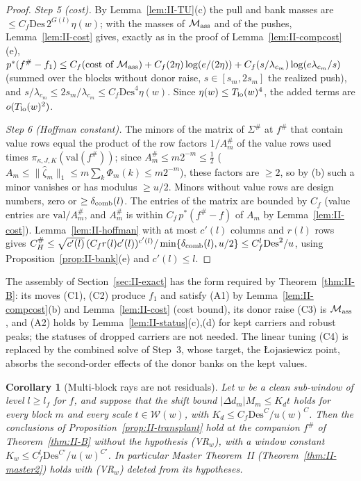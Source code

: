 \documentclass[10pt]{amsart}
\newtheorem{corollary}[theorem]{Corollary}
\theoremstyle{definition}
\theoremstyle{remark}
\begin{document}
\begin{proof}
\emph{Step 5 (cost).}  By Lemma~\ref{lem:II-TU}(c) the pull and bank
masses are $\le C_f\mathrm{Des}\,2^{G(l)}\eta(w)$; with the masses of
$\mathcal M_{\rm ass}$ and of the pushes, Lemma~\ref{lem:II-cost} gives,
exactly as in the proof of Lemma~\ref{lem:II-compcost}(e),
$p^*(f^\#-f_1)\le C_f(\text{cost of }\mathcal M_{\rm ass})+C_f(2\eta)\log(e/
(2\eta))+C_f(s/\lambda_{c_m})\log(e\lambda_{c_m}/s)$ (summed over the
blocks without donor raise, $s\in[s_m,2s_m]$ the realized push), and
$s/\lambda_{c_m}\le2s_m/\lambda_{c_m}\le C_f\mathrm{Des}^4\eta(w)$.  Since $\eta(w)\le T_{\rm lo}(w)^4$,
the added terms are $o(T_{\rm lo}(w)^2)$.

\emph{Step 6 (Hoffman constant).}  The minors of the matrix of $\Sigma^\#$
at $f^\#$ that contain value rows equal the product of the row factors
$1/A^\#_m$ of the value rows used times $\pi_{\kappa,J,K}(\mathrm{val}(f^\#))$;
since $A^\#_m\le m2^{-m}\le\frac12$ \textup{(}$A_m\le\|\hat\zeta_m\|_1\le
m\sum_k\Phi_m(k)\le m2^{-m}$\textup{)}, these factors are $\ge2$, so by (b)
such a minor vanishes or has modulus $\ge u/2$.  Minors without value rows
are design numbers, zero or $\ge\delta_{\rm comb}(l)$.  The entries of the
matrix are bounded by $C_f$ (value entries are $\mathrm{val}/A^\#_m$, and
$A^\#_m$ is within $C_f\,p^*(f^\#-f)$ of $A_m$ by Lemma~\ref{lem:II-cost}).
Lemma~\ref{lem:II-hoffman} with at most $c'(l)$ columns and $r(l)$ rows gives
$C^\#_H\le\sqrt{c'(l)}\,(C_fr(l)c'(l))^{c'(l)}/\min\{\delta_{\rm comb}(l),u/2\}
\le C_f^l\mathrm{Des}^2/u$, using Proposition~\ref{prop:II-bank}(e) and
$c'(l)\le l$.
\end{proof}

The assembly of Section~\ref{sec:II-exact} has the form required by
Theorem~\ref{thm:II-B}: its moves (C1), (C2) produce $f_1$ and satisfy (A1)
by Lemma~\ref{lem:II-compcost}(b) and Lemma~\ref{lem:II-cost} (cost bound),
its donor raise (C3) is $\mathcal M_{\rm ass}$, and (A2) holds by
Lemma~\ref{lem:II-status}(c),(d) for kept carriers and robust peaks; the
statuses of dropped carriers are not needed.  The linear tuning (C4) is replaced by the
combined solve of Step~3, whose target, the {\L}ojasiewicz point, absorbs
the second-order effects of the donor banks on the kept values.

\begin{corollary}[Multi-block rays are not residuals]\label{cor:II-B1}
Let $w$ be a clean sub-window of level $l\ge l_f$ for $f$, and suppose that
the shift bound $|\Delta d_m|M_m\le K_dt$ holds for every block $m$ and
every scale $t\in\mathcal W(w)$, with $K_d\le C_f\mathrm{Des}^{C}/u(w)^{C}$.
Then the conclusions of Proposition~\textup{\ref{prop:II-transplant}} hold at the
companion $f^\#$ of Theorem~\textup{\ref{thm:II-B}} without the hypothesis
\textup{(VR$_w$)}, with a window constant $K_w\le C_f^l\mathrm{Des}^{C'}/
u(w)^{C'}$.  In particular Master Theorem~II
\textup{(}Theorem~\textup{\ref{thm:II-master2})} holds with \textup{(VR$_w$)}
deleted from its hypotheses.
\end{corollary}
\end{document}
